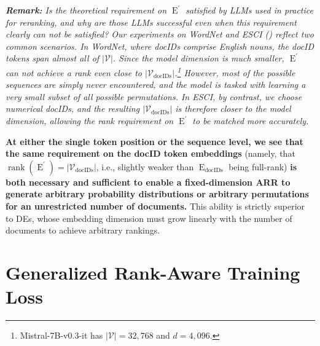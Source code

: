 \documentclass[11pt, a4paper, onecolumn, confidential, copyright, gdm]{google}
\newcommand{\Edocids}{\operatorname{E}_{\text{docIDs}}}
\newcommand{\Eprime}{\operatorname{E}^{\prime}}
\newcommand{\Vdocids}{\mathscr{V}_{\text{docIDs}}}
\begin{document}
\textit{\textbf{Remark:} Is the theoretical requirement on $\Eprime$ satisfied by LLMs used in practice for reranking, and why are those LLMs successful even when this requirement clearly can not be satisfied? Our experiments on WordNet and ESCI () reflect two common scenarios. In WordNet, where docIDs comprise English nouns, the docID tokens span almost all of $|\mathcal{V}|$. Since the model dimension is much smaller, $\Eprime$ can not achieve a rank even close to $|\Vdocids|$.\footnote{Mistral-7B-v0.3-it has $|\mathcal{V}|=32,768$ and $d=4,096$.} However, most of the possible sequences are simply never encountered, and the model is tasked with learning a very small subset of all possible permutations. In ESCI, by contrast, we choose numerical docIDs, and the resulting $|\Vdocids|$ is therefore closer to the model dimension, allowing the rank requirement on $\Eprime$ to be matched more accurately.}

\textbf{At either the single token position or the sequence level, we see that the same requirement on the docID token embeddings} (namely, that $\operatorname{rank}(\Eprime) = |\Vdocids|$, i.e., slightly weaker than $\Edocids$ being full-rank) \textbf{is both necessary and sufficient to enable a fixed-dimension ARR to generate arbitrary probability distributions or arbitrary permutations for an unrestricted number of documents.} This ability is strictly superior to DEs, whose embedding dimension must grow linearly with the number of documents to achieve arbitrary rankings.

\section{Generalized Rank-Aware Training Loss}\label{sec:rank-aware-training-loss}
\end{document}
